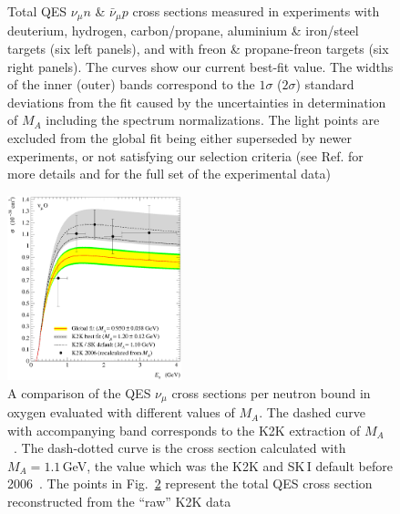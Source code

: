 \documentclass[preprint]{elsarticle}
\begin{document}
\begin{figure}[h!]
\begin{center}
\caption{\label{TotalCS}Total QES $\nu_{\mu}n$ \& $\bar\nu_{\mu}p$ cross sections measured in experiments with deuterium, hydrogen, carbon/propane, aluminium \& iron/steel targets (six left panels), and with freon \& propane-freon targets (six right panels). The curves show our current best-fit value. The widths of the inner (outer) bands correspond to the $1\sigma$ ($2\sigma$) standard deviations from the fit caused by the uncertainties in determination of $M_A$ including the spectrum normalizations. The light points are excluded from the global fit being either superseded by newer experiments, or not satisfying our selection criteria (see Ref.\cite{Kuzmin:2007kr} for more details and for the full set of the experimental data)}
\end{center}
\end{figure}

\begin{figure}[h!]
\begin{center}
\includegraphics[width=0.45\textwidth]{./QES/sQESCC_K2K06_101.3.00.301.00_2_BBBA25_SM.eps}
\caption{\label{K2K}A comparison of the QES $\nu_{\mu}$ cross sections per neutron bound in oxygen evaluated with different values of $M_A$. The dashed curve with accompanying band corresponds to the K2K extraction of $M_A$~\cite{Gran:2006jn}. The dash-dotted curve is the cross section calculated with $M_A=1.1$\,GeV, the value which was the K2K and SK\,I default before 2006~\cite{Gran:2006jn,Ashie:2005ik}. The points in Fig.~\ref{K2K} represent the total QES cross section reconstructed from the ``raw'' K2K data}
\end{center}
\end{figure}
\end{document}
